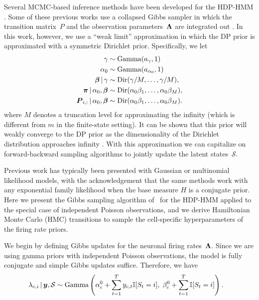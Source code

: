 Several MCMC-based inference methods have been developed for the
HDP-HMM \citep{Beal02,Teh06,van08}. Some of these previous works use a
collapsed Gibbs sampler in which the transition matrix~$P$ and the
observation parameters~$\boldsymbol{\Lambda}$ are integrated out
\citep{Teh06,van08}. In this work, however, we use a ``weak limit''
approximation in which the DP prior is approximated with a symmetric
Dirichlet prior. Specifically, we let
\begin{align}
\label{eq:hdphmm_trans}
\gamma &\sim \mathrm{Gamma}(a_\gamma, 1) \\
\nonumber \alpha_0 &\sim \mathrm{Gamma}(a_{\alpha_0}, 1) \\
\nonumber \boldsymbol{\beta} \,|\, \gamma &\sim \mathrm{Dir}(\gamma/M, \ldots, \gamma/M), \\
\nonumber \boldsymbol{\pi} \,|\, \alpha_0, \boldsymbol{\beta} &\sim \mathrm{Dir}(\alpha_0 \beta_1, \ldots, \alpha_0 \beta_M), \\
\nonumber \boldsymbol{P}_{i,:} \,|\, \alpha_0, \boldsymbol{\beta} &\sim \mathrm{Dir}(\alpha_0 \beta_1, \ldots, \alpha_0 \beta_M).
\end{align}
where $M$ denotes a truncation level for approximating the infinity
(which is different from $m$ in the finite-state setting).  It can be
shown that this prior will weakly converge to the DP prior as the
dimensionality of the Dirichlet distribution approaches infinity
\citep{Johnson14, Ishwaran02}. With this approximation we can
capitalize on forward-backward sampling algorithms to jointly update
the latent states~$\mathcal{S}$.

Previous work has typically been presented with Gaussian or
multinomial likelihood models, with the acknowledgement that the same
methods work with any exponential family likelihood when the base
measure $H$ is a conjugate prior.  Here we present the Gibbs sampling
algorithm of~\citep{Teh06} for the HDP-HMM applied to the special case
of independent Poisson observations, and we derive Hamiltonian Monte
Carlo (HMC) transitions to sample the cell-specific hyperparameters of
the firing rate priors.

We begin by defining Gibbs updates for the neuronal firing
rates~$\boldsymbol{\Lambda}$. Since we are using gamma priors with independent
Poisson observations, the model is fully conjugate and simple Gibbs
updates suffice. Therefore, we have
\begin{align}
\lambda_{c,i} \,|\, \boldsymbol{y}, \mathcal{S} &\sim \mathrm{Gamma}\left(\alpha_c^0 + \sum_{t=1}^T y_{c,t} \mathbb{I}[S_t=i], \;\beta_c^0 + \sum_{t=1}^T \mathbb{I}[S_t=i]\right).
\end{align}

